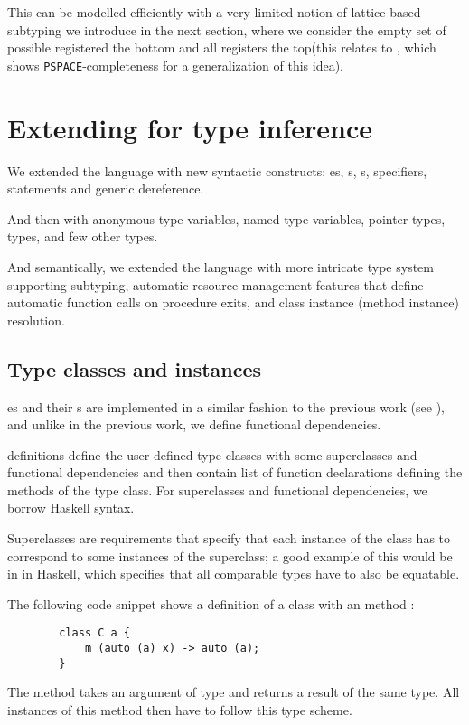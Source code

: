This can be modelled efficiently with a very limited notion of lattice-based subtyping we introduce in the next section, where we consider the empty set of possible registered the bottom and all registers the top(this relates to \cite{tiuryn1992subtype}, which shows \texttt{PSPACE}-completeness for a generalization of this idea).

\section{Extending \cmm{} for type inference}

We extended the language with new syntactic constructs: es, s, s,  specifiers,  statements and \li{[ptr]} generic dereference.

And then with  anonymous type variables,  named type variables,  pointer types,  types, and few other types.

And semantically, we extended the language with more intricate type system supporting subtyping, automatic resource management features that define automatic function calls on procedure exits, and class instance (method instance) resolution.

\subsection{Type classes and instances}

es and their s are implemented in a similar fashion to the previous work (see \cite{klepl2020type}), and unlike in the previous work, we define functional dependencies.

 definitions define the user-defined type classes with some superclasses and functional dependencies and then contain list of function declarations defining the methods of the type class. For superclasses and functional dependencies, we borrow Haskell syntax.

Superclasses are requirements that specify that each instance of the class has to correspond to some instances of the superclass; a good example of this would be  in  in Haskell, which specifies that all comparable types have to also be equatable.

\begin{ex}[Classes]
    The following code snippet shows a definition of a class  with an method :

    \begin{lstlisting}
        class C a {
            m (auto (a) x) -> auto (a);
        }
    \end{lstlisting}

    The method  takes an argument of type  and returns a result of the same type. All instances of this method then have to follow this type scheme.
\end{ex}

